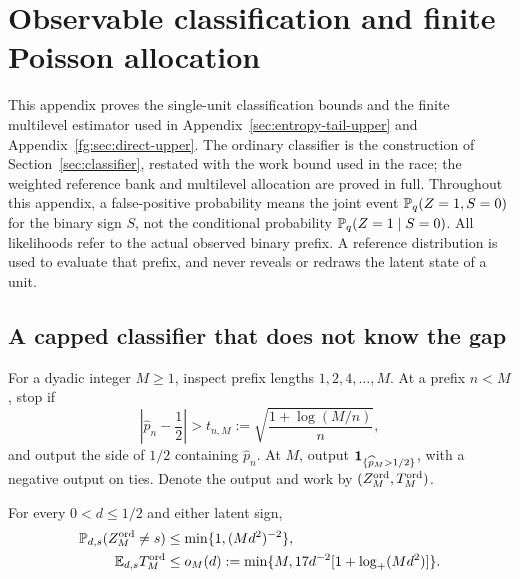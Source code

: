 \section{Observable classification and finite Poisson allocation}
\label{sec:uf-foundations}

This appendix proves the single-unit classification bounds and the
finite multilevel estimator used in Appendix~\ref{sec:entropy-tail-upper}
and Appendix~\ref{fg:sec:direct-upper}. The ordinary classifier is the
construction of Section~\ref{sec:classifier}, restated with the work bound
used in the race; the weighted reference bank and multilevel allocation
are proved in full. Throughout this appendix, a false-positive probability
means the joint event $\mathbb P_q(Z=1,S=0)$ for the binary sign $S$, not the
conditional probability $\mathbb P_q(Z=1\mid S=0)$. All likelihoods
refer to the actual observed binary prefix. A reference distribution
is used to evaluate that prefix, and never reveals or redraws the
latent state of a unit.

\subsection{A capped classifier that does not know the gap}

For a dyadic integer $M\ge1$, inspect prefix lengths
$1,2,4,\ldots,M$. At a prefix $n<M$, stop if
\[
 \left|\widehat p_n-\frac12\right|>
 t_{n,M}:=\sqrt{\frac{1+\log(M/n)}{n}},
\]
and output the side of $1/2$ containing $\widehat p_n$. At $M$, output
$\mathbf 1_{\{\widehat p_M>1/2\}}$, with a negative output on ties.
Denote the output and work by $(Z_M^{\rm ord},T_M^{\rm ord})$.

\begin{lemma}\label{lem:uf-ordinary}
For every $0<d\le1/2$ and either latent sign,
\begin{align}
 \mathbb P_{d,s}(Z_M^{\rm ord}\ne s)
 &\le \min\{1,(Md^2)^{-2}\},\label{eq:uf-ordinary-error}\\
 \mathbb E_{d,s}T_M^{\rm ord}
 &\le o_M(d):=\min\{M,17d^{-2}[1+\log_+(Md^2)]\}.
 \label{eq:uf-ordinary-work}
\end{align}
\end{lemma}

